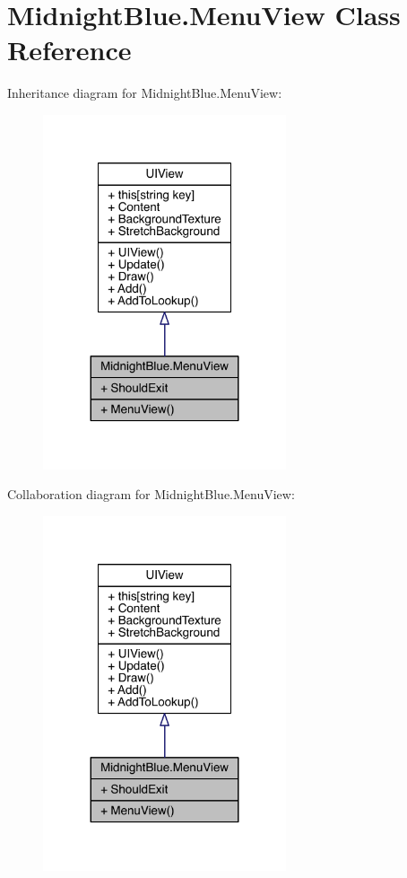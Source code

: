 \hypertarget{class_midnight_blue_1_1_menu_view}{}\section{Midnight\+Blue.\+Menu\+View Class Reference}
\label{class_midnight_blue_1_1_menu_view}


Inheritance diagram for Midnight\+Blue.\+Menu\+View\+:\nopagebreak
\begin{figure}[H]
\begin{center}
\leavevmode
\includegraphics[width=203pt]{class_midnight_blue_1_1_menu_view__inherit__graph}
\end{center}
\end{figure}


Collaboration diagram for Midnight\+Blue.\+Menu\+View\+:\nopagebreak
\begin{figure}[H]
\begin{center}
\leavevmode
\includegraphics[width=203pt]{class_midnight_blue_1_1_menu_view__coll__graph}
\end{center}
\end{figure}
